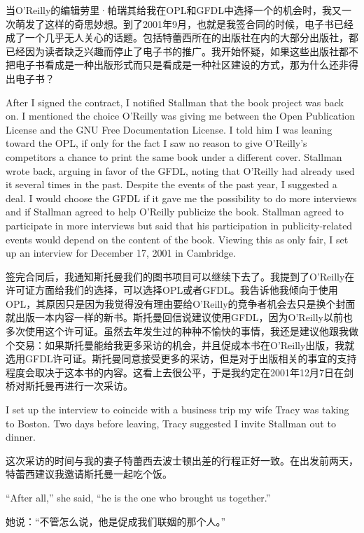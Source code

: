 \ifdefined\chs
当O'Reilly的编辑劳里·帕瑞其给我在OPL和GFDL中选择一个的机会时，我又一次萌发了这样的奇思妙想。到了2001年9月，也就是我签合同的时候，电子书已经成了一个几乎无人关心的话题。包括特蕾西所在的出版社在内的大部分出版社，都已经因为读者缺乏兴趣而停止了电子书的推广。我开始怀疑，如果这些出版社都不把电子书看成是一种出版形式而只是看成是一种社区建设的方式，那为什么还非得出电子书？
\fi

\ifdefined\eng
After I signed the contract, I notified Stallman that the book project was back on. I mentioned the choice O'Reilly was giving me between the Open Publication License and the GNU Free Documentation License. I told him I was leaning toward the OPL, if only for the fact I saw no reason to give O'Reilly's competitors a chance to print the same book under a different cover. Stallman wrote back, arguing in favor of the GFDL, noting that O'Reilly had already used it several times in the past. Despite the events of the past year, I suggested a deal. I would choose the GFDL if it gave me the possibility to do more interviews and if Stallman agreed to help O'Reilly publicize the book. Stallman agreed to participate in more interviews but said that his participation in publicity-related events would depend on the content of the book. Viewing this as only fair, I set up an interview for December 17, 2001 in Cambridge.
\fi

\ifdefined\chs
签完合同后，我通知斯托曼我们的图书项目可以继续下去了。我提到了O'Reilly在许可证方面给我们的选择，可以选择OPL或者GFDL。我告诉他我倾向于使用OPL，其原因只是因为我觉得没有理由要给O'Reilly的竞争者机会去只是换个封面就出版一本内容一样的新书。斯托曼回信说建议使用GFDL，因为O'Reilly以前也多次使用这个许可证。虽然去年发生过的种种不愉快的事情，我还是建议他跟我做个交易：如果斯托曼能给我更多采访的机会，并且促成本书在O'Reilly出版，我就选用GFDL许可证。斯托曼同意接受更多的采访，但是对于出版相关的事宜的支持程度会取决于这本书的内容。这看上去很公平，于是我约定在2001年12月7日在剑桥对斯托曼再进行一次采访。
\fi

\ifdefined\eng
I set up the interview to coincide with a business trip my wife Tracy was taking to Boston. Two days before leaving, Tracy suggested I invite Stallman out to dinner.
\fi

\ifdefined\chs
这次采访的时间与我的妻子特蕾西去波士顿出差的行程正好一致。在出发前两天，特蕾西建议我邀请斯托曼一起吃个饭。
\fi

\ifdefined\eng
``After all,'' she said, ``he is the one who brought us together.''
\fi

\ifdefined\chs
她说：``不管怎么说，他是促成我们联姻的那个人。''
\fi

